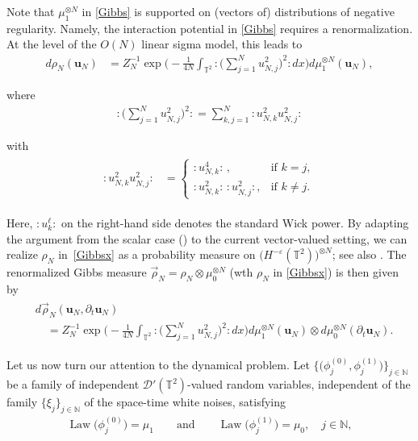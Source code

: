 \documentclass[letterpaper, 11pt,  reqno]{amsart}
\DeclareMathOperator{\Law}{Law}
\newcommand{\1}{\hspace{0.5mm}\text{I}\hspace{0.2mm}}
\newcommand{\noi}{\noindent}
\newcommand{\T}{\mathbb{T}}
\newcommand{\N}{\mathbb{N}}
\newcommand{\D}{\mathcal{D}}
\newcommand{\eps}{\varepsilon}
\newcommand{\dt}{\partial_t}
\newcommand{\rhoo}{\vec \rho_N}
\newcommand{\wick}[1]{:\!{#1}\!:}
\newcommand{\uu}{\mathbf{u}}
\renewcommand{\l}{\ell}
\numberwithin{equation}{section}
\numberwithin{theorem}{section}
\begin{document}
Note that $\mu_1^{\otimes N}$ 
in \eqref{Gibbs} is supported on (vectors of) distributions
of negative regularity.
Namely, the interaction potential in \eqref{Gibbs}
requires a renormalization.
At the level of 
the 
$O(N)$ linear sigma model, this leads to 
\begin{align}
d \rho_N (\uu_N)
&  = Z_N^{-1} \exp \bigg( - \frac{1}{4N} \int_{\T^2} 
\wick{\Big( \sum_{j = 1}^N u_{N, j}^2 \Big)^2} dx \bigg) 
d \mu_1^{\otimes N} 
    (\uu_N) , 
\label{Gibbsx}
\end{align}

\noi
where 
\begin{align*}
\wick{\Big( \sum_{j = 1}^N u_{N, j}^2 \Big)^2} 
= 
\sum_{k, j = 1}^N 
\wick{u_{N, k}^2 u_{N, j}^2 }
\end{align*}

\noi
with 
\begin{align*}
\begin{split}
 \wick{ u_{N, k}^2u_{N, j}^2 } & = 
\begin{cases}
\wick{u_{N, k}^4}\,, & \text{if } k = j, \\
\wick{u_{N, k}^2}\, \wick{u_{N, j}^2}, & \text{if } k \ne j.
\end{cases}
\end{split}
\end{align*}


\noi
Here, 
$\wick{u_k^\l}$ on the right-hand side denotes
the standard Wick power.
By adapting the argument from the scalar case
(\cite{Nelson2, DPT, OTh}) to the current vector-valued setting, 
we can realize $\rho_N$ in~\eqref{Gibbsx}
as a probability measure
on $\big(H^{-\eps} (\T^2)\big)^{\otimes N}$;
see also \cite[Remark~5.8]{SSZZ}.
The renormalized Gibbs measure $\rhoo
= \rho_N \otimes \mu_0^{\otimes N}$ 
(wth $\rho_N$ in \eqref{Gibbsx}) is then given by 
\begin{align}
\begin{split}
& d \rhoo 
(\uu_N, \dt \uu_N) \\
& \quad = Z_N^{-1} \exp \bigg( - \frac{1}{4N} \int_{\T^2} 
\wick{\Big( \sum_{j = 1}^N u_{N, j}^2 \Big)^2} dx \bigg) 
d \mu_1^{\otimes N} 
    (\uu_N) 
\otimes d  \mu_0^{\otimes N} (\dt \uu_N).
\end{split}
\label{Gibbsy}
\end{align}








Let us now turn our attention to the dynamical problem.
Let 
$\big\{ \big(\phi^{(0)}_j, \phi^{(1)}_j\big)\big\}_{j \in \N}$
be  a family of independent $\D'(\T^2)$-valued random variables, 
independent of the family $\{\xi_j\}_{j \in \N}$
of the space-time white noises, 
satisfying 
\begin{align}
\Law \big(\phi^{(0)}_j\big) = \mu_1
\qquad \text{and}\qquad  
\Law \big(\phi^{(1)}_j\big) = \mu_0, \quad j \in \N, 
\label{gauss2}
\end{align}
\end{document}
